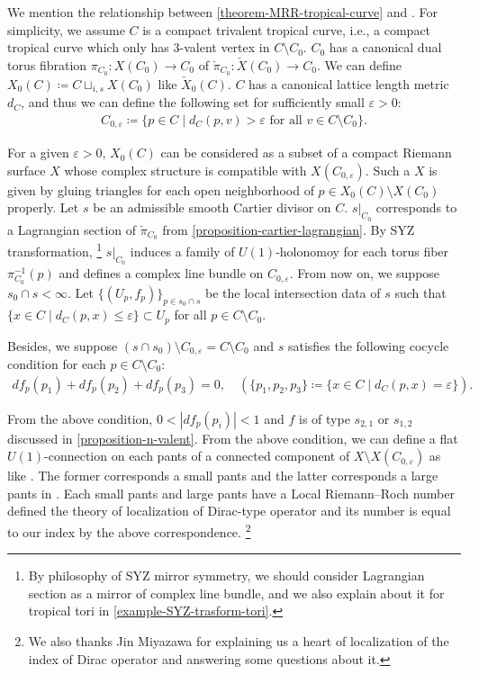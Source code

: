 \documentclass[a4paper,dvipdfmx,reqno,12pt]{amsart}
\theoremstyle{definition}
\newcommand{\deq}{\coloneqq}
\newcommand{\vep}{\varepsilon}%
\newcommand{\myfootnote}[1]{\hspace{-5pt}\footnote{#1}}
\numberwithin{equation}{section}
\begin{document}
We mention the relationship between 
\cref{theorem-MRR-tropical-curve} and
\cite[6]{MR2676658}.
For simplicity,
we assume $C$ is a compact trivalent tropical curve, i.e.,
a compact tropical curve which only has $3$-valent
vertex in $C\setminus C_0$.  
$C_0$ has a canonical dual torus fibration 
$\pi_{C_0}\colon X(C_0)\to C_0$ of
$\check{\pi}_{C_0} \colon \check{X}(C_0)\to C_0$.
We can define $X_0(C)\deq C\sqcup_{i,s} X(C_0)$ like
$\check{X}_0(C)$.
$C$ has a canonical lattice length metric $d_{C}$, and
thus we can define the following set for sufficiently small
$\vep >0$: 
\begin{align}
C_{0,\vep}\deq \{p\in C\mid d_C(p,v)>\vep 
\text{ for all } v\in C\setminus C_0\}.
\end{align}

For a given $\vep>0$, $X_0(C)$ can be considered as a subset of a compact 
Riemann surface $X$ whose complex structure is 
compatible with $X(C_{0,\vep})$. 
Such a $X$ is given by gluing triangles for 
each open neighborhood of $p\in X_0(C)\setminus X(C_0)$
properly.
Let $s$ be an admissible smooth Cartier divisor on $C$.
$s|_{C_0}$ corresponds to a Lagrangian section of 
$\check{\pi}_{C_0}$ from 
\cref{proposition-cartier-lagrangian}.
By SYZ transformation,
\myfootnote{By philosophy of SYZ mirror symmetry,
we should consider Lagrangian section 
as a mirror of complex line bundle,
and we also explain about it for tropical tori in 
\cref{example-SYZ-trasform-tori}.
}
$s|_ {C_0}$ induces a family of $U(1)$-holonomoy for
each torus fiber $\pi_{C_0}^{-1}(p)$ and defines a 
complex line bundle on $C_{0,\vep}$. From now on, 
we suppose $s_0\cap s<\infty$. 
Let $\{(U_p, f_p)\}_{p\in s_0\cap s}$ be the local intersection data 
of $s$ such that 
$\{x\in C\mid d_C(p,x)\leq \vep\}\subset U_p$ for
all $p\in C\setminus C_0$.

Besides, we suppose 
$(s\cap s_0)\setminus C_{0,\vep}=C\setminus C_0$ and $s$ satisfies the following cocycle
condition for each $p\in C\setminus C_0$:
\begin{align}
df_p(p_1)+df_p(p_2)+df_p(p_3)=0,\quad 
(\{p_1,p_2,p_3\}\deq \{x\in C\mid d_C(p,x)=\vep\}).
\end{align}

From the above condition, $0<|df_p(p_i)|<1$ and
$f$ is of type $s_{2,1}$ or $s_{1,2}$ discussed
in \cref{proposition-n-valent}.
From the above condition, we can define 
a flat $U(1)$-connection on each pants of a 
connected component of $X\setminus X(C_{0,\vep})$
as like \cite[6.1.3]{MR2676658}. The former 
corresponds a small pants and the latter
corresponds a large pants in 
\cite[Definition 6.3]{MR2676658}.
Each small pants and large pants have a Local 
Riemann--Roch number defined the theory of 
localization of Dirac-type operator and its 
number is equal 
to our index by the above correspondence.
\myfootnote{
We also thanks Jin Miyazawa
for explaining us a heart of localization of 
the index of Dirac operator and answering some 
questions about it.}
\end{document}
